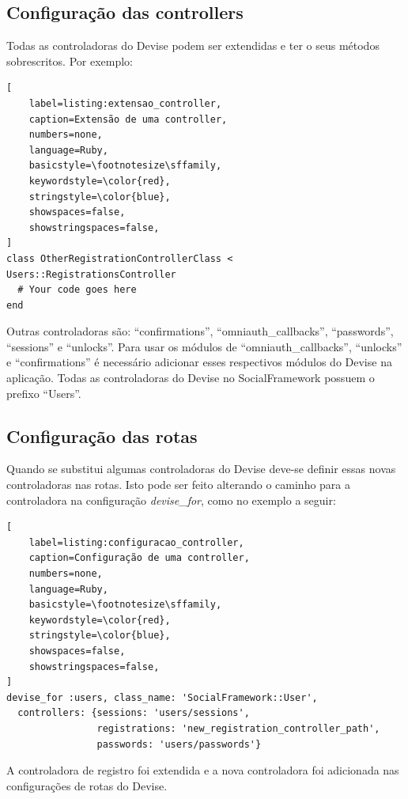 \subsection{Configuração das controllers}

Todas as controladoras do Devise podem ser extendidas e ter o seus métodos sobrescritos. Por exemplo:

\begin{lstlisting}[
    label=listing:extensao_controller,
    caption=Extensão de uma controller,
    numbers=none,
    language=Ruby,
    basicstyle=\footnotesize\sffamily,
    keywordstyle=\color{red},
    stringstyle=\color{blue},
    showspaces=false,
    showstringspaces=false,
]
class OtherRegistrationControllerClass < Users::RegistrationsController
  # Your code goes here
end
\end{lstlisting}

Outras controladoras são: ``confirmations'', ``omniauth\_callbacks'', ``passwords'', ``sessions'' e ``unlocks''. Para usar os módulos de ``omniauth\_callbacks'', ``unlocks'' e ``confirmations'' é necessário adicionar esses respectivos módulos do Devise na aplicação. Todas as controladoras do Devise no SocialFramework possuem o prefixo ``Users''.

\subsection{Configuração das rotas}

Quando se substitui algumas controladoras do Devise deve-se definir essas novas controladoras nas rotas. Isto pode ser feito alterando o caminho para a controladora na configuração \textit{devise\_for}, como no exemplo a seguir:

\begin{lstlisting}[
    label=listing:configuracao_controller,
    caption=Configuração de uma controller,
    numbers=none,
    language=Ruby,
    basicstyle=\footnotesize\sffamily,
    keywordstyle=\color{red},
    stringstyle=\color{blue},
    showspaces=false,
    showstringspaces=false,
]
devise_for :users, class_name: 'SocialFramework::User',
  controllers: {sessions: 'users/sessions',
                registrations: 'new_registration_controller_path',
                passwords: 'users/passwords'}
\end{lstlisting}

A controladora de registro foi extendida e a nova controladora foi adicionada nas configurações de rotas do Devise.


